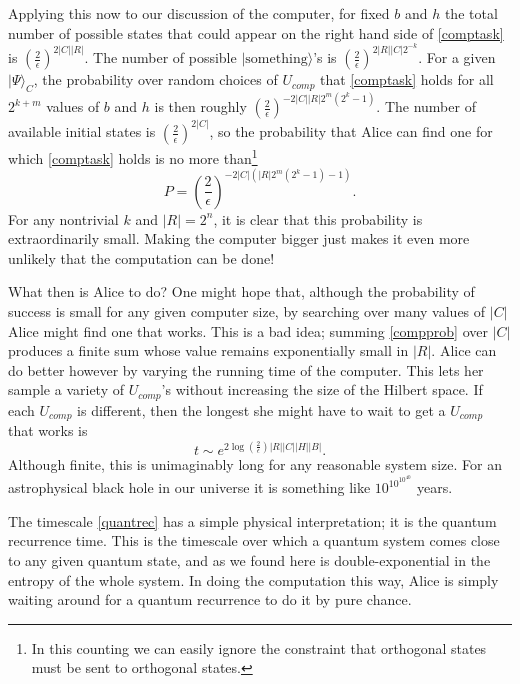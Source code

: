 \documentclass[12pt]{article}
\newcommand{\be}{\begin{equation}}
\newcommand{\ee}{\end{equation}}
\newcommand{\ran}{\rangle}
\begin{document}
Applying this now to our discussion of the computer, for fixed $b$ and $h$ the total number of possible states that could appear on the right hand side of \eqref{comptask} is $\left(\frac{2}{\epsilon}\right)^{2|C||R|}$.  The number of possible $|\mathrm{something}\ran$'s is $\left(\frac{2}{\epsilon}\right)^{2|R||C|2^{-k}}$.  For a given $|\Psi\ran_C$, the probability over random choices of $U_{comp}$ that \eqref{comptask} holds for all $2^{k+m}$ values of $b$ and $h$ is then roughly $
\left(\frac{2}{\epsilon}\right)^{-2|C||R|2^m(2^k-1)}$.  The number of available initial states is $\left(\frac{2}{\epsilon}\right)^{2|C|}$, so the probability that Alice can find one for which \eqref{comptask} holds is no more than\footnote{In this counting we can easily ignore the constraint that orthogonal states must be sent to orthogonal states.}
\be\label{compprob}
P=\left(\frac{2}{\epsilon}\right)^{-2|C|\left(|R|2^m(2^k-1)-1\right)}.
\ee
For any nontrivial $k$ and $|R|=2^n$, it is clear that this probability is extraordinarily small.  Making the computer bigger just makes it even more unlikely that the computation can be done!  

What then is Alice to do?  One might hope that, although the probability of success is small for any given computer size, by searching over many values of $|C|$ Alice might find one that works.  This is a bad idea; summing \eqref{compprob} over $|C|$ produces a finite sum whose value remains exponentially small in $|R|$.  Alice can do better however by varying the running time of the computer.  This lets her sample a variety of $U_{comp}$'s without increasing the size of the Hilbert space.  If each $U_{comp}$ is different, then the longest she might have to wait to get a $U_{comp}$ that works is 
\be\label{quantrec}
t\sim e^{2\log\left(\frac{2}{\epsilon}\right)|R||C||H||B|}.
\ee
Although finite, this is unimaginably long for any reasonable system size.  For an astrophysical black hole in our universe it is something like $10^{10^{10^{40}}}$ years.  

The timescale \eqref{quantrec} has a simple physical interpretation; it is the quantum recurrence time.  This is the timescale over which a quantum system comes close to any given quantum state, and as we found here is double-exponential in the entropy of the whole system.  In doing the computation this way, Alice is simply waiting around for a quantum recurrence to do it by pure chance.
\end{document}
